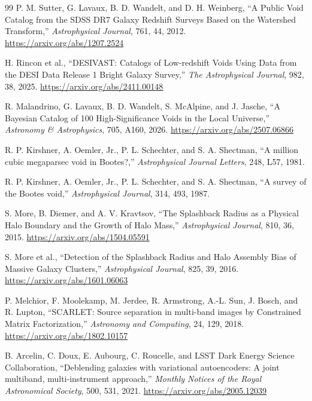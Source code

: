 \begin{thebibliography}{99}
P. M. Sutter, G. Lavaux, B. D. Wandelt, and D. H. Weinberg,
``A Public Void Catalog from the SDSS DR7 Galaxy Redshift Surveys Based on the Watershed Transform,''
\emph{Astrophysical Journal}, 761, 44, 2012.
\url{https://arxiv.org/abs/1207.2524}

H. Rincon et al.,
``DESIVAST: Catalogs of Low-redshift Voids Using Data from the DESI Data Release 1 Bright Galaxy Survey,''
\emph{The Astrophysical Journal}, 982, 38, 2025.
\url{https://arxiv.org/abs/2411.00148}

R. Malandrino, G. Lavaux, B. D. Wandelt, S. McAlpine, and J. Jasche,
``A Bayesian Catalog of 100 High-Significance Voids in the Local Universe,''
\emph{Astronomy \& Astrophysics}, 705, A160, 2026.
\url{https://arxiv.org/abs/2507.06866}

R. P. Kirshner, A. Oemler, Jr., P. L. Schechter, and S. A. Shectman,
``A million cubic megaparsec void in Bootes?,''
\emph{Astrophysical Journal Letters}, 248, L57, 1981.

R. P. Kirshner, A. Oemler, Jr., P. L. Schechter, and S. A. Shectman,
``A survey of the Bootes void,''
\emph{Astrophysical Journal}, 314, 493, 1987.

S. More, B. Diemer, and A. V. Kravtsov,
``The Splashback Radius as a Physical Halo Boundary and the Growth of Halo Mass,''
\emph{Astrophysical Journal}, 810, 36, 2015.
\url{https://arxiv.org/abs/1504.05591}

S. More et al.,
``Detection of the Splashback Radius and Halo Assembly Bias of Massive Galaxy Clusters,''
\emph{Astrophysical Journal}, 825, 39, 2016.
\url{https://arxiv.org/abs/1601.06063}

P. Melchior, F. Moolekamp, M. Jerdee, R. Armstrong, A.-L. Sun, J. Bosch, and R. Lupton,
``SCARLET: Source separation in multi-band images by Constrained Matrix Factorization,''
\emph{Astronomy and Computing}, 24, 129, 2018.
\url{https://arxiv.org/abs/1802.10157}

B. Arcelin, C. Doux, E. Aubourg, C. Roucelle, and LSST Dark Energy Science Collaboration,
``Deblending galaxies with variational autoencoders: A joint multiband, multi-instrument approach,''
\emph{Monthly Notices of the Royal Astronomical Society}, 500, 531, 2021.
\url{https://arxiv.org/abs/2005.12039}


\end{thebibliography}
